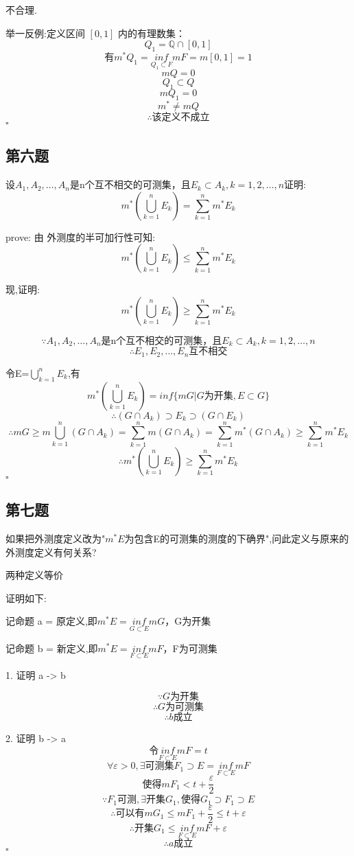 \documentclass[a4paper]{article}
\begin{document}
        不合理.

        举一反例:定义区间 $[0,1]$ 内的有理数集：
        \[Q_1=\mathbb{Q}\cap[0,1]\]
        \[\text{有}m^{*}Q_1=\underset{Q_1\subset F}{inf}mF=m[0,1]=1\]
        \[mQ=0\]
        \[Q_1\subset Q\]
        \[mQ_1=0\]
        \[m^{*}\ne mQ\]
        \[\therefore \text{该定义不成立}\]
    \hfill $\square$

    \subsection{第六题}
    设$A_1,A_2,\ldots,A_n$是n个互不相交的可测集，且$E_k \subset A_k,k=1,2,\ldots ,n$证明:
    \[m^*(\bigcup_{k=1}^{n}E_k)=\sum_{k=1}^{n}m^*E_k\]

    prove:
    由 外测度的半可加行性可知:
    \[m^*(\bigcup_{k=1}^{n}E_k) \le \sum_{k=1}^{n}m^*E_k\]
    
    现,证明:
    \[m^*(\bigcup_{k=1}^{n}E_k) \ge \sum_{k=1}^{n}m^*E_k\]

    \[\because A_1,A_2,\ldots,A_n \text{是n个互不相交的可测集，且}E_k \subset A_k,k=1,2,\ldots ,n\]
    \[\therefore E_1,E_2,\ldots ,E_n \text{互不相交}\]

    令E=$\bigcup_{k=1}^{n}E_k$,有
    \[m^*(\bigcup_{k=1}^{n}E_k)=inf\{mG|G\text{为开集},E\subset G\}\]
    \[\therefore (G\cap A_k) \supset E_k \supset (G\cap E_k)\]
    \[\therefore mG \ge m\bigcup_{k=1}^{n}(G\cap A_k)=\sum_{k=1}^{n}m(G \cap A_k) = \sum_{k=1}^{n}m^*(G \cap A_k) \ge \sum_{k=1}^{n}m^*E_k\]
    \[\therefore m^*(\bigcup_{k=1}^{n}E_k) \ge \sum_{k=1}^{n}m^*E_k\]
    \hfill $\square$

    \subsection{第七题}
    如果把外测度定义改为"$m^{*}E$为包含E的可测集的测度的下确界",问此定义与原来的外测度定义有何关系?

        两种定义等价

        证明如下:

        记命题 a = 原定义,即$m^{*}E=\underset{G\subset E}{inf}mG$，G为开集

        记命题 b = 新定义,即$m^{*}E=\underset{F\subset E}{inf}mF$，F为可测集

        1. 证明 a -> b

        \[\because G \text{为开集}\]
        \[\therefore G \text{为可测集}\]
        \[\therefore b\text{成立}\]

        2. 证明 b -> a
        \[令\underset{F\subset E}{inf}mF = t\]
        \[\forall \varepsilon >0,\exists \text{可测集}F_1 \supset E=\underset{F\subset E}{inf}mF\]
        \[\text{使得}mF_1<t+\frac{\varepsilon}{2}\]
        \[\because F_1 \text{可测},\exists \text{开集}G_1,\text{使得}G_1\supset F_1\supset E\]
        \[\therefore \text{可以有}mG_1 \le mF_1 + \frac{\varepsilon}{2} \le t + \varepsilon\]
        \[\therefore \text{开集}G_1 \le \underset{F\subset E}{inf}mF + \varepsilon\]
        \[\therefore a\text{成立}\]
    \hfill $\square$
\end{document}
